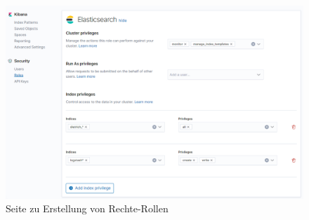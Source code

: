 \begin{figure}
	\centering
	\includegraphics[width=1\linewidth]{images/setup/kibana_roles.png}
	\caption{Seite zu Erstellung von Rechte-Rollen}
	\label{img:kibanaRoles}
\end{figure}